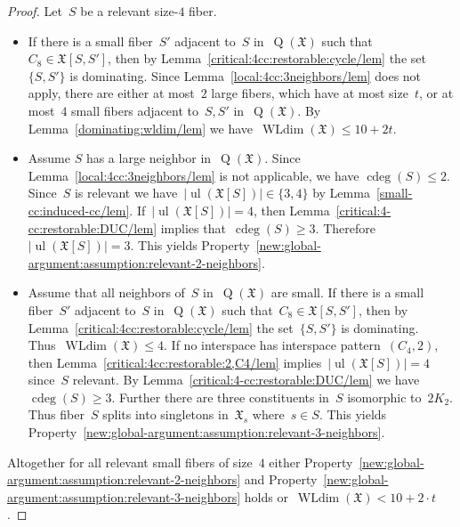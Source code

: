\documentclass[english,a4paper]{article}
\theoremstyle{plain}
\theoremstyle{definition}
\newcommand{\coherentConfig}{\ensuremath{\mathfrak{X}}}
\newcommand{\interspace}[2]{\ensuremath{\coherentConfig[#1,#2]}}
\newcommand{\inducedCC}[1]{\ensuremath{\coherentConfig[#1]}}
\DeclareMathOperator*{\ul}{ul}
\DeclareMathOperator*{\WLdim}{WLdim}
\newcommand{\wldim}[1]{\ensuremath{\WLdim\left(#1\right)}}
\DeclareMathOperator*{\Quotient}{Q}
\newcommand{\quotientGraph}[1]{\ensuremath{\Quotient(#1)}}
\DeclareMathOperator{\ColorDeg}{cdeg}
\newcommand{\colorDeg}[1]{\ensuremath{\ColorDeg\left(#1\right)}}
\newcommand{\ipfourCycle}   {\ensuremath{(\cycle{4},2)}}
\newcommand{\clique}[1]{\ensuremath{K_{#1}}}
\newcommand{\cycle}[1]{\ensuremath{C_{#1}}}
\newcommand{\disjointCliques}[2]{\ensuremath{#1 \clique{#2}}}
\begin{document}
\begin{proof}
    Let~$S$ be a relevant size-$4$ fiber.
    \begin{itemize}
        \item
        If there is a small fiber~$S'$ adjacent to~$S$ in~$\quotientGraph{\coherentConfig}$ such that~$\cycle{8} \in \interspace{S}{S'}$, then by Lemma~\ref{critical:4cc:restorable:cycle/lem} the set~$\{S,S'\}$ is dominating.
        Since Lemma~\ref{local:4cc:3neighbors/lem} does not apply, there are either at most~$2$ large fibers, which have at most size~$t$, or at most~$4$ small fibers adjacent to~$S,S'$ in~$\quotientGraph{\coherentConfig}$.
        By Lemma~\ref{dominating:wldim/lem} we have~$\wldim{\coherentConfig} \leq 10+2t$.

        \item
        Assume $S$ has a large neighbor in~$\quotientGraph{\coherentConfig}$.
        Since Lemma~\ref{local:4cc:3neighbors/lem} is not applicable, we have $\colorDeg{S} \leq 2$.
        Since~$S$ is relevant we have~$|\ul(\inducedCC{S})| \in \{3,4\}$ by Lemma~\ref{small-cc:induced-cc/lem}.
        If~$|\ul(\inducedCC{S})| = 4$, then Lemma~\ref{critical:4-cc:restorable:DUC/lem} implies that~$\colorDeg{S} \geq 3$.
        Therefore~$|\ul(\inducedCC{S})| = 3$.
        This yields Property~\ref{new:global-argument:assumption:relevant-2-neighbors}.

        \item
        Assume that all neighbors of~$S$ in~$\quotientGraph{\coherentConfig}$ are small.
        If there is a small fiber~$S'$ adjacent to~$S$ in~$\quotientGraph{\coherentConfig}$ such that~$\cycle{8} \in \interspace{S}{S'}$, then by Lemma~\ref{critical:4cc:restorable:cycle/lem} the set~$\{S,S'\}$ is dominating.
        Thus~$\wldim{\coherentConfig} \leq 4$.
        If no interspace has interspace pattern~$\ipfourCycle$, then Lemma~\ref{critical:4cc:restorable:2,C4/lem} implies~$|\ul(\inducedCC{S})| = 4$ since~$S$ relevant.
        By Lemma~\ref{critical:4-cc:restorable:DUC/lem} we have~$\colorDeg{S} \geq 3$.
        Further there are three constituents in~$S$ isomorphic to~$\disjointCliques{2}{2}$.
        Thus fiber~$S$ splits into singletons in~$\coherentConfig_s$ where~$s \in S$.
        This yields Property~\ref{new:global-argument:assumption:relevant-3-neighbors}.
    \end{itemize}
    Altogether for all relevant small fibers of size~$4$ either Property~\ref{new:global-argument:assumption:relevant-2-neighbors} and Property~\ref{new:global-argument:assumption:relevant-3-neighbors} holds or~$\wldim{\coherentConfig} < 10 + 2\cdot t$.


\end{proof}
\end{document}
